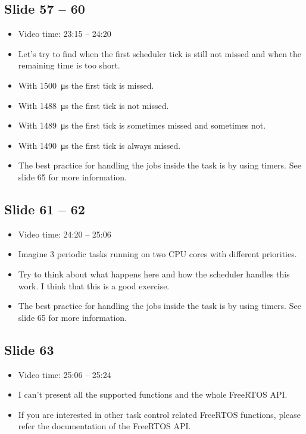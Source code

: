 \documentclass[12pt, a4paper]{article}
\begin{document}
	\subsection{Slide 57 -- 60}
	\begin{itemize}
		\item Video time: 23:15 -- 24:20
		\item Let's try to find when the first scheduler tick is still not missed and when the remaining time is too short.
		\item With \SI{1500}{\micro \second} the first tick is missed.
		\item With \SI{1488}{\micro \second} the first tick is not missed.
		\item With \SI{1489}{\micro \second} the first tick is sometimes missed and sometimes not.
		\item With \SI{1490}{\micro \second} the first tick is always missed.
		\item The best practice for handling the jobs inside the task is by using timers. See slide 65 for more information.
	\end{itemize}

	\subsection{Slide 61 -- 62}
	\begin{itemize}
		\item Video time: 24:20 -- 25:06
		\item Imagine 3 periodic tasks running on two CPU cores with different priorities.
		\item Try to think about what happens here and how the scheduler handles this work. I think that this is a good exercise.
		\item The best practice for handling the jobs inside the task is by using timers. See slide 65 for more information.
	\end{itemize}

	\subsection{Slide 63}
	\begin{itemize}
		\item Video time: 25:06 -- 25:24
		\item I can't present all the supported functions and the whole FreeRTOS API.
		\item If you are interested in other task control related FreeRTOS functions, please refer the documentation of the FreeRTOS API.
	\end{itemize}
\end{document}
